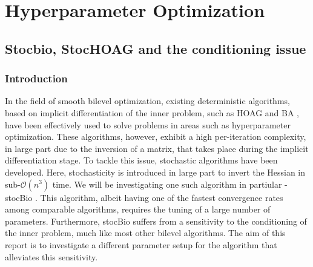 \documentclass[11pt, twoside]{report}
\begin{document}
\part{Hyperparameter Optimization}

\chapter{Stocbio, StocHOAG and the conditioning issue} \label{chp: stoc_cond}
\section{Introduction}
In the field of smooth bilevel optimization, existing deterministic algorithms, based on implicit differentiation of the inner problem, such as HOAG \cite{pedregosa2016hyperparameter} and BA \cite{ghadimi2018approximation}, have been effectively used to solve problems in areas such as hyperparameter optimization. These algorithms, however, exhibit a high per-iteration complexity, in large part due to the inversion of a matrix, that takes place during the implicit differentiation stage. To tackle this issue, stochastic algorithms have been developed. Here, stochasticity is introduced in large part to invert the Hessian in sub-$\mathcal{O}(n^3)$ time. We will be investigating one such algorithm in partiular - stocBio \cite{ji2021bilevel}. This algorithm, albeit having one of the fastest convergence rates among comparable algorithms, requires the tuning of a large number of parameters. Furthermore, stocBio suffers from a sensitivity to the conditioning of the inner problem, much like most other bilevel algorithms. The aim of this report is to investigate a different parameter setup for the algorithm that alleviates this sensitivity.
\end{document}
